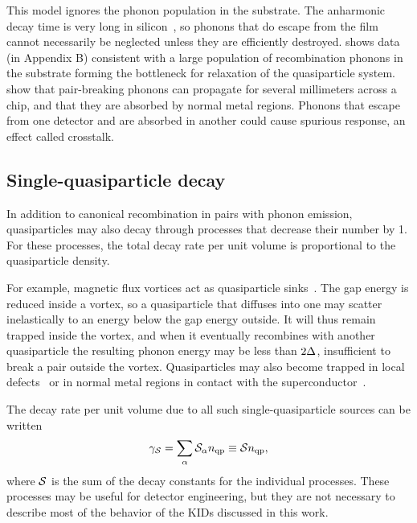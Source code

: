 
This model ignores the phonon population in the substrate.
The anharmonic decay time is very long in silicon~\autocite{Maris1993PRB}, so phonons that do escape from the film cannot necessarily be neglected unless they are efficiently destroyed.
\textcite{deVisser2014} shows data (in Appendix B) consistent with a large population of recombination phonons in the substrate forming the bottleneck for relaxation of the quasiparticle system.
\textcite{Patel2017PRB} show that pair-breaking phonons can propagate for several millimeters across a chip, and that they are absorbed by normal metal regions.
Phonons that escape from one detector and are absorbed in another could cause spurious response, an effect called crosstalk.


\subsection{Single-quasiparticle decay}
\label{sec:theory.quasiparticle.single_decay}

In addition to canonical recombination in pairs with phonon emission, quasiparticles may also decay through processes that decrease their number by 1.
For these processes, the total decay rate per unit volume is proportional to the quasiparticle density.

For example, magnetic flux vortices act as quasiparticle sinks~\autocite{Ullom1998APL,Wang2014NatComm}.
The gap energy is reduced inside a vortex, so a quasiparticle that diffuses into one may scatter inelastically to an energy below the gap energy outside.
It will thus remain trapped inside the vortex, and when it eventually recombines with another quasiparticle the resulting phonon energy may be less than $2 \Delta$, insufficient to break a pair outside the vortex.
Quasiparticles may also become trapped in local defects~\autocite{Kozorezov2001APL} or in normal metal regions in contact with the superconductor~\autocite{Joyez1994PRL, Riwar2016PRB}.

The decay rate per unit volume due to all such single-quasiparticle sources can be written
\begin{equation}
\gamma_{\mathcal{S}}
  =
  \sum_\alpha \mathcal{S}_\alpha n_{\mathrm{qp}}
  \equiv
  \mathcal{S} n_{\mathrm{qp}},
\label{eqn:rate_qpsingledecay}
\end{equation}
where $\mathcal{S}$ is the sum of the decay constants for the individual processes.
These processes may be useful for detector engineering, but they  are not necessary to describe most of the behavior of the KIDs discussed in this work.


